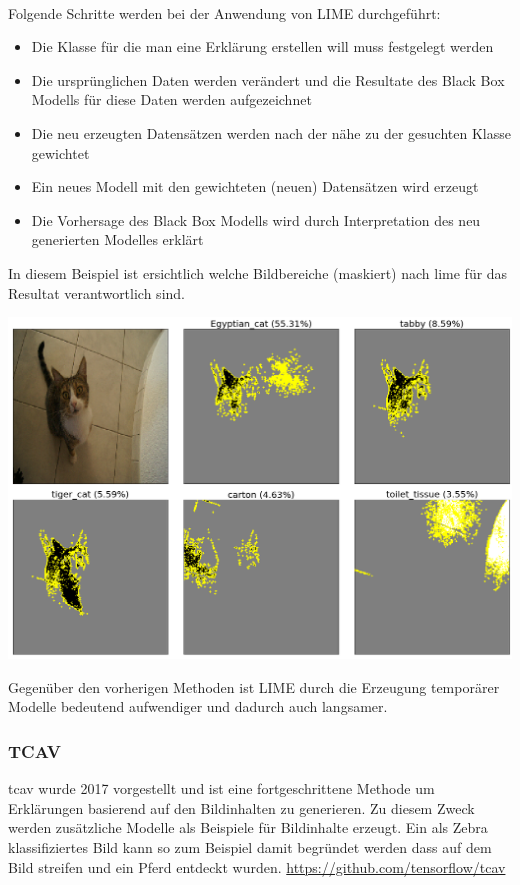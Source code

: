 \documentclass[
  12pt, %
  a4paper, %
  oneside, %
  openany, 
  numbers=noenddot, %
  BCOR=5mm, %
  parskip=half*, %
  thesis, %
]{bfhbook}
\begin{document}
\paragraph*{}
Folgende Schritte werden bei der Anwendung von LIME durchgeführt:
\begin{itemize}
	\item Die Klasse für die man eine Erklärung erstellen will muss festgelegt werden
	\item Die ursprünglichen Daten werden verändert und die Resultate des Black Box Modells für diese Daten werden aufgezeichnet
	\item Die neu erzeugten Datensätzen werden nach der nähe zu der gesuchten Klasse gewichtet
	\item Ein neues Modell mit den gewichteten (neuen) Datensätzen wird erzeugt
	\item Die Vorhersage des Black Box Modells wird durch Interpretation des neu generierten Modelles erklärt
\end{itemize}
\break
In diesem Beispiel ist ersichtlich welche Bildbereiche (maskiert) nach \gls{lime} für das Resultat verantwortlich sind.

\includegraphics[width=\textwidth]{Bilder/Lime-Classes.png}

Gegenüber den vorherigen Methoden ist LIME durch die Erzeugung temporärer Modelle bedeutend aufwendiger und dadurch auch langsamer.
\subsubsection*{TCAV}
 \acrfull{tcav} wurde 2017 vorgestellt \parencite{Kim2017} und ist eine fortgeschrittene Methode um Erklärungen basierend auf den Bildinhalten zu generieren. Zu diesem Zweck werden zusätzliche Modelle als Beispiele für Bildinhalte erzeugt. Ein als Zebra klassifiziertes Bild kann so zum Beispiel damit begründet werden dass auf dem Bild streifen und ein Pferd entdeckt wurden.
\url{https://github.com/tensorflow/tcav}
\end{document}
